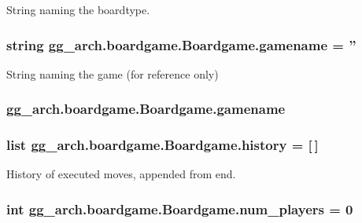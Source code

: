 String naming the boardtype. 

\hypertarget{classgg__arch_1_1boardgame_1_1_boardgame_a2a5812dbb5fc2c63a6f551958006f1c7}{
\subsubsection[{gamename}]{\setlength{\rightskip}{0pt plus 5cm}string gg\-\_\-arch.\-boardgame.\-Boardgame.\-gamename = ''\hspace{0.3cm}{\ttfamily [static]}}}\label{classgg__arch_1_1boardgame_1_1_boardgame_a2a5812dbb5fc2c63a6f551958006f1c7}


String naming the game (for reference only) 

\hypertarget{classgg__arch_1_1boardgame_1_1_boardgame_add740b057e0253407caaecd570f67291}{
\subsubsection[{gamename}]{\setlength{\rightskip}{0pt plus 5cm}gg\-\_\-arch.\-boardgame.\-Boardgame.\-gamename}}\label{classgg__arch_1_1boardgame_1_1_boardgame_add740b057e0253407caaecd570f67291}
\hypertarget{classgg__arch_1_1boardgame_1_1_boardgame_aba6edf60f3fe1db68ba0942b286f6db1}{
\subsubsection[{history}]{\setlength{\rightskip}{0pt plus 5cm}list gg\-\_\-arch.\-boardgame.\-Boardgame.\-history = \mbox{[}$\,$\mbox{]}\hspace{0.3cm}{\ttfamily [static]}}}\label{classgg__arch_1_1boardgame_1_1_boardgame_aba6edf60f3fe1db68ba0942b286f6db1}


History of executed moves, appended from end. 

\hypertarget{classgg__arch_1_1boardgame_1_1_boardgame_a300c594f23db1b4c6659e23ec6304832}{
\subsubsection[{num\-\_\-players}]{\setlength{\rightskip}{0pt plus 5cm}int gg\-\_\-arch.\-boardgame.\-Boardgame.\-num\-\_\-players = 0\hspace{0.3cm}{\ttfamily [static]}}}\label{classgg__arch_1_1boardgame_1_1_boardgame_a300c594f23db1b4c6659e23ec6304832}


